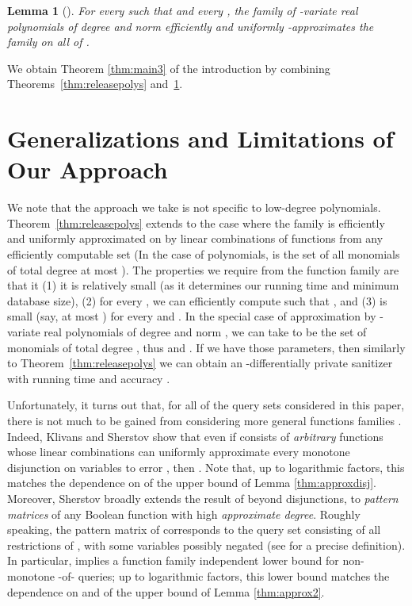 \documentclass[11pt]{article}
\newtheorem{lemma}[theorem]{Lemma}
\theoremstyle{definition}
\begin{document}
\begin{lemma}[\cite{KlivansSe04}] \label{dlfact} For every  such that  and every , the family  of -variate real polynomials of degree  and norm  efficiently and uniformly -approximates the family  on all of .
\end{lemma}


We obtain Theorem \ref{thm:main3} of the introduction by combining Theorems~\ref{thm:releasepolys} and~\ref{dlfact}.  
\ifnum{}

\section{Generalizations and Limitations of Our Approach}
We note that the approach we take is not specific to low-degree polynomials.  Theorem~\ref{thm:releasepolys} extends to the case where the family  is efficiently and uniformly approximated on  by linear combinations of functions from any efficiently computable set  (In the case of polynomials,  is the set of all monomials of total degree at most ).  The properties we require from the function family  are that it (1) it is relatively small (as it determines our running time and minimum database size), (2) for every , we can efficiently compute  such that , and (3)  is small (say, at most ) for every  and .  In the special case of approximation by -variate real polynomials of degree  and norm , we can take  to be the set of monomials of total degree , thus  and .  If we have those parameters, then similarly to Theorem~\ref{thm:releasepolys} we can obtain an -differentially private sanitizer with running time  and accuracy .

Unfortunately, it turns out that, for all of the query sets considered in this paper, there is not much to be gained from considering more general functions families . Indeed, Klivans and Sherstov \cite[Theorem 1.1]{KlivansSh10} show that even
if  consists of \emph{arbitrary} functions 
whose linear combinations can uniformly approximate every monotone disjunction on  variables to error , then . Note that, up to logarithmic factors, this matches the dependence on  of the upper bound of Lemma \ref{thm:approxdisj}. 
Moreover, Sherstov \cite[Theorem 8.1]{Sh11pattern} broadly extends the result of \cite{KlivansSh10} beyond disjunctions, to \emph{pattern matrices} of any Boolean function 
with high \emph{approximate degree}. Roughly speaking, the pattern matrix of  corresponds to the query set consisting of all restrictions of , with some variables possibly negated (see 
\cite{Sh11pattern} for a precise definition). In particular, \cite[Theorem 8.1]{Sh11pattern} implies a function family independent lower bound for non-monotone -of- queries;
up to logarithmic factors, this lower bound matches the dependence on  and  of the upper bound of Lemma \ref{thm:approx2}.
\end{document}

